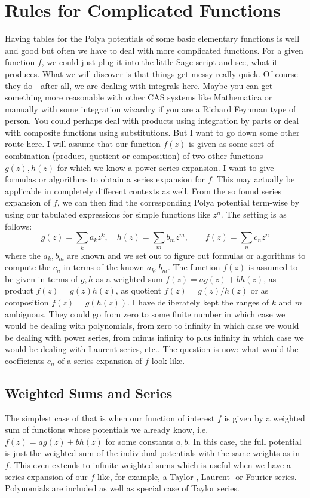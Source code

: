 \documentclass[12pt]{article}
\begin{document}
\section{Rules for Complicated Functions}
Having tables for the Polya potentials of some basic elementary functions is well and good but often we have to deal with more complicated functions. For a given function $f$, we could just plug it into the little Sage script and see, what it produces. What we will discover is that things get messy really quick. Of course they do - after all, we are dealing with integrals here. Maybe you can get something more reasonable with other CAS systems like Mathematica or manually with some integration wizardry if you are a Richard Feynman type of person. You could perhaps deal with products using integration by parts or deal with composite functions using substitutions. But I want to go down some other route here. I will assume that our function $f(z)$ is given as some sort of combination (product, quotient or composition) of two other functions $g(z), h(z)$ for which we know a power series expansion. I want to give formulas or algorithms to obtain a series expansion for $f$. This may actually be applicable in completely different contexts as well. From the so found series expansion of $f$, we can then find the corresponding Polya potential term-wise by using our tabulated expressions for simple functions like $z^n$. The setting is as follows:
\begin{equation}
g(z) = \sum_k a_k z^k, \quad
h(z) = \sum_m b_m z^m, \qquad
f(z) = \sum_n c_n z^n
\end{equation}
where the $a_k, b_m$ are known and we set out to figure out formulas or algorithms to compute the $c_n$ in terms of the known $a_k, b_m$. The function $f(z)$ is assumed to be given in terms of $g,h$ as a weighted sum $f(z) = a g(z) + b h(z)$, as product $f(z) = g(z) h(z)$, as quotient $f(z) = g(z) / h(z)$ or as composition $f(z) = g(h(z))$. I have deliberately kept the ranges of $k$ and $m$ ambiguous. They could go from zero to some finite number in which case we would be dealing with polynomials, from zero to infinity in which case we would be dealing with power series, from minus infinity to plus infinity in which case we would be dealing with Laurent series, etc.. The question is now: what would the coefficients $c_n$ of a series expansion of $f$ look like.

\subsection{Weighted Sums and Series}
The simplest case of that is when our function of interest $f$ is given by a weighted sum of functions whose potentials we already know, i.e. $f(z) = a g(z) + b h(z)$ for some constants $a,b$. In this case, the full potential is just the weighted sum of the individual potentials with the same weights as in $f$. This even extends to infinite weighted sums which is useful when we have a series expansion of our $f$ like, for example, a Taylor-, Laurent- or Fourier series. Polynomials are included as well as special case of Taylor series.
\end{document}
